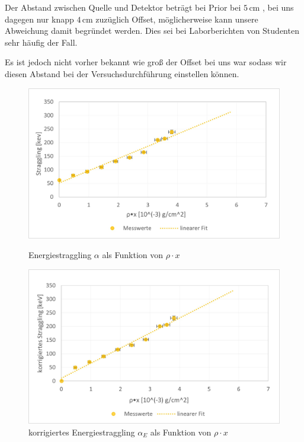 \documentclass[12pt,a4paper]{scrartcl}
\numberwithin{equation}{section} %
\begin{document}
Der Abstand zwischen Quelle und Detektor beträgt bei Prior bei $5\mathrm{\,cm}$  \cite{Prior}, bei uns dagegen nur knapp $4\mathrm{\,cm}$ zuzüglich Offset, möglicherweise kann unsere Abweichung damit begründet werden. Dies sei bei Laborberichten von Studenten sehr häufig der Fall. \cite{Prior}

Es ist jedoch nicht vorher bekannt wie groß der Offset bei uns war sodass wir diesen Abstand bei der Versuchsdurchführung einstellen können.

\begin{figure}[H]
	\centering
	\begin{minipage}{0.9\textwidth}
		\includegraphics[width=\textwidth]{../media/B3.3/Straggling.jpg}
		\caption{Energiestraggling $\alpha$ als Funktion von $\rho \cdot x$}
		\label{abb:Straggling}
		\vspace{12pt}
	
		\includegraphics[width=\textwidth]{../media/B3.3/Straggling corrected.jpg}
		\caption{korrigiertes Energiestraggling $\alpha _E$ als Funktion von $\rho \cdot x$}
		\label{abb:korr. Straggling}
	\end{minipage}
\end{figure}
\end{document}
